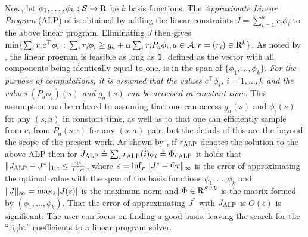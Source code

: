 Now, let $\phi_1,\ldots,\phi_k : \mathcal{S} \to \mathrm{R}$ be $k$ basis functions. 
The \emph{Approximate Linear Program} (ALP) of \citet{SchSei85} 
is obtained by adding the linear constraints $J = \sum_{i=1}^k r_i \phi_i$ to the above linear program. Eliminating $J$ then gives $\min\{ \sum_i r_i c^\top \phi_i \,:\, \sum_i r_i \phi_i \ge g_a + \alpha \sum_i r_i P_a \phi_i, a\in \mathcal{A}, r = (r_i)\in \mathrm{R}^k \}$.
As noted by \citet{SchSei85}, the linear program is feasible as long as $\mathbf{1}$, defined as the vector with all components being identically equal to one, is in the span of $\{\phi_1,\dots,\phi_k\}$. 
\emph{For the purpose of computations, it is assumed that the values $c^\top \phi_i$, $i=1,\dots, k$ and the values $(P_a \phi_i)(s)$ and $g_a(s)$ can be accessed in constant time.} 
This assumption can be relaxed to assuming that one can access $g_a(s)$ and $\phi_i(s)$ for any $(s,a)$ in constant time, as well as to that one can efficiently sample from $c$, from $P_a(s,\cdot)$ for any $(s,a)$ pair, 
but the details of this are the beyond the scope of the present work. As shown by \citet{ALP}, if $r_{\text{ALP}}$ denotes the solution to the above ALP then for $J_{\text{ALP}} \doteq \sum_i r_{\text{ALP}}(i) \phi_i \doteq \Phi r_{\text{ALP}}$ it holds that $\|J_{\text{ALP}} - J^*\|_{1,c} \le \frac{2 \varepsilon}{1-\alpha}$, where $\varepsilon = \inf_r \| J^* - \Phi r \|_\infty$ is the error of approximating the optimal value with the span of the basis functions $\phi_1,\dots,\phi_k$ and $\|J\|_\infty = \max_s |J(s)|$ is the maximum norm and $\Phi \in \mathrm{R}^{S\times k}$ is the matrix formed by $(\phi_1,\dots,\phi_k)$. That the error of approximating $J^*$ with $J_{\text{ALP}}$ is $O(\epsilon)$ is significant: The user can focus on finding a good basis, leaving the search for the ``right'' coefficients to a linear program solver.

